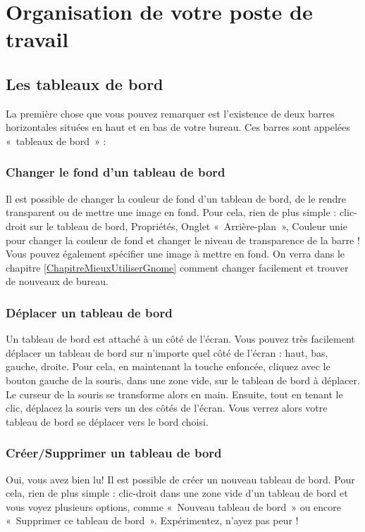 \section{Organisation de votre poste de travail}
\subsection{Les tableaux de bord}
La première chose que vous pouvez remarquer est l'existence de deux barres horizontales situées en haut et en bas de votre bureau. Ces barres sont appelées «~tableaux de bord~» :
\subsubsection{Changer le fond d'un tableau de bord}
Il est possible de changer la couleur de fond d'un tableau de bord, de le rendre transparent ou de mettre une image en fond. Pour cela, rien de plus simple : clic-droit sur le tableau de bord, Propriétés, Onglet «~Arrière-plan~», Couleur unie pour changer la couleur de fond et changer le niveau de transparence de la barre ! Vous pouvez également spécifier une image à mettre en fond. On verra dans le chapitre \ref{ChapitreMieuxUtiliserGnome} comment changer facilement et trouver de nouveaux  de bureau.
\subsubsection{Déplacer un tableau de bord}
Un tableau de bord est attaché à un côté de l'écran. Vous pouvez très facilement déplacer un tableau de bord sur n'importe quel côté de l'écran : haut, bas, gauche, droite. Pour cela, en maintenant la touche  enfoncée, cliquez avec le bouton gauche de la souris, dans une zone vide, sur le tableau de bord à déplacer. Le curseur de la souris se transforme alors en main. Ensuite, tout en tenant le clic, déplacez la souris vers un des côtés de l'écran. Vous verrez alors votre tableau de bord se déplacer vers le bord choisi.
\subsubsection{Créer/Supprimer un tableau de bord}
Oui, vous avez bien lu! Il est possible de créer un nouveau tableau de bord. Pour cela, rien de plus simple : clic-droit dans une zone vide d'un tableau de bord et vous voyez plusieurs options, comme «~Nouveau tableau de bord~» ou encore «~Supprimer ce tableau de bord~». Expérimentez, n'ayez pas peur !
